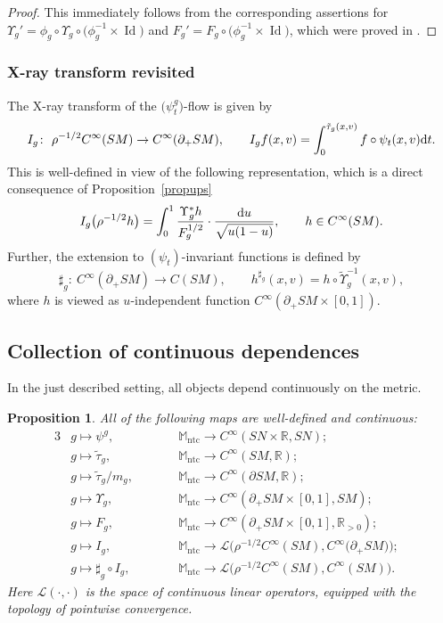 \documentclass[10pt,a4paper]{amsart}
\numberwithin{equation}{section}
\newtheorem{Proposition}[Theorem]{Proposition}
\theoremstyle{definition}
\newcommand{\R}{\mathbb{R}} %
\newcommand{\M}{\mathbb{M}}
\newcommand{\1}{{\bf 1}}
\newcommand{\ntc}{\mathrm{ntc}}
\begin{document}
\begin{proof}
This immediately follows from the corresponding assertions for $\Upsilon_g'=\phi_g\circ \Upsilon_g\circ \bigl(\phi_g^{-1}\times \operatorname{Id}\bigr)$ and $F_g'=F_g\circ \bigl(\phi_g^{-1}\times \operatorname{Id}\bigr)$, which were proved in \cite{MNP20}.
\end{proof}

\subsubsection{X-ray transform revisited}
The X-ray transform of the $\bigl(\psi^g_t\bigr)$-flow is given by
\[
	I_g\colon\ \rho^{-1/2}C^\infty(SM)\rightarrow C^\infty(\partial_+SM),\qquad I_g f(x,v)=\int_0^{\tilde \tau_g(x,v)} f\circ \psi_t(x,v) {\rm d}t.
\]
This is well-defined in view of the following representation, which is a direct consequence of Proposition~\ref{propups}
\begin{equation}\label{igrep}
		I_g \bigl(\rho^{-1/2}h\bigr) = \int_0^1
		\frac{\Upsilon_g^*h}{F_g^{1/2}}\cdot \frac{{\rm d}u}{\sqrt{u(1-u)}},\qquad h\in C^\infty(SM).
\end{equation}
Further, the extension to $(\psi_t)$-invariant functions is defined by
\[
	\sharp_g\colon\ C^\infty(\partial_+SM)\rightarrow C(SM),\qquad h^{\sharp_g}(x,v) = h\circ \tilde \Upsilon_g^{-1}(x,v),
\]
where $h$ is viewed as $u$-independent function $C^\infty(\partial_+SM\times [0,1])$.


\subsection{Collection of continuous dependences}
In the just described setting, all objects depend continuously on the metric.
\begin{Proposition}\label{thm_continuitygalore}
	All of the following maps are well-defined and continuous:
	\begin{alignat}{3}
 & g\mapsto \psi^g, \qquad&& \M_\ntc\rightarrow C^\infty(SN\times \R,SN);& \tag{i}\\
& g\mapsto \tilde \tau_g, \qquad&& \M_\ntc\rightarrow C^\infty(SM,\R);& \tag{ii}\\
& g\mapsto \tilde \tau_g/m_g, \qquad&& \M_\ntc\rightarrow C^\infty(\partial SM,\R);&\tag{iii}\\
& g\mapsto \Upsilon_g, \qquad&& \M_\ntc\rightarrow C^\infty(\partial_+SM\times [0,1],SM);&\tag{iv}\\
& g \mapsto F_g, \qquad&& \M_\ntc\rightarrow C^\infty(\partial_+SM\times [0,1],\R_{>0});& \tag{v}\\
&g \mapsto I_g, \qquad&& \M_\ntc\rightarrow \mathcal L\bigl(\rho^{-1/2}C^\infty(SM),C^\infty({\partial_+SM)}\bigr);&\tag{vi}\\
& g\mapsto \sharp_g\circ I_g, \qquad&&  \M_\ntc\rightarrow \mathcal L\bigl(\rho^{-1/2}C^\infty(SM),C^\infty(SM)\bigr). & \tag{vii}
\end{alignat}		
Here $\mathcal L(\cdot,\cdot)$ is the space of continuous linear operators, equipped with the topology of pointwise convergence.
\end{Proposition}
\end{document}
